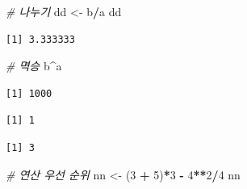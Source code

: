 \documentclass[
  11pt,
]{krantz}
\newenvironment{Shaded}{\begin{snugshade}}{\end{snugshade}}
\newcommand{\CommentTok}[1]{\textcolor[rgb]{0.37,0.37,0.37}{\textit{#1}}}
\newcommand{\DecValTok}[1]{\textcolor[rgb]{0.06,0.06,0.06}{#1}}
\newcommand{\NormalTok}[1]{#1}
\newcommand{\OperatorTok}[1]{\textcolor[rgb]{0.43,0.43,0.43}{\textbf{#1}}}
\newcommand{\StringTok}[1]{\textcolor[rgb]{0.5,0.5,0.5}{#1}}
\begin{document}
\begin{Shaded}
\begin{Highlighting}[]
\CommentTok{# 나누기}
\NormalTok{dd <-}\StringTok{ }\NormalTok{b}\OperatorTok{/}\NormalTok{a}
\NormalTok{dd}
\end{Highlighting}
\end{Shaded}

\begin{verbatim}
[1] 3.333333
\end{verbatim}

\begin{Shaded}
\begin{Highlighting}[]
\CommentTok{# 멱승}
\NormalTok{b}\OperatorTok{^}\NormalTok{a}
\end{Highlighting}
\end{Shaded}

\begin{verbatim}
[1] 1000
\end{verbatim}

\begin{Shaded}
\end{Shaded}

\begin{verbatim}
[1] 1
\end{verbatim}

\begin{Shaded}
\end{Shaded}

\begin{verbatim}
[1] 3
\end{verbatim}

\begin{Shaded}
\begin{Highlighting}[]
\CommentTok{# 연산 우선 순위}
\NormalTok{nn <-}\StringTok{ }\NormalTok{(}\DecValTok{3} \OperatorTok{+}\StringTok{ }\DecValTok{5}\NormalTok{)}\OperatorTok{*}\DecValTok{3} \OperatorTok{-}\StringTok{ }\DecValTok{4}\OperatorTok{**}\DecValTok{2}\OperatorTok{/}\DecValTok{4}
\NormalTok{nn}
\end{Highlighting}
\end{Shaded}
\end{document}
